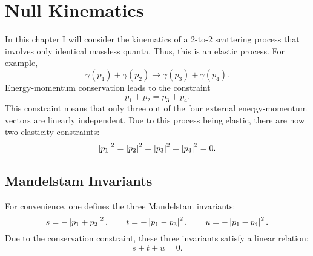 \chapter{Null Kinematics}
In this chapter I will consider the kinematics of a 2-to-2 scattering process that involves only identical massless quanta. Thus, this is an elastic process. For example,
\begin{equation}
	\gamma(p_{1}) + \gamma(p_{2}) \longrightarrow \gamma(p_{3}) + \gamma(p_{4}).
\end{equation}
Energy-momentum conservation leads to the constraint
\begin{equation}
	p_{1} + p_{2} = p_{3} + p_{4}.
\end{equation}
This constraint means that only three out of the four external energy-momentum vectors are linearly independent. Due to this process being elastic, there are now two elasticity constraints:
\begin{equation}
	\left\lvert p_{1} \right\rvert^{2} = \left\lvert p_{2} \right\rvert^{2} = \left\lvert p_{3} \right\rvert^{2} = \left\lvert p_{4} \right\rvert^{2} = 0.
\end{equation}
\section{Mandelstam Invariants}
For convenience, one defines the three Mandelstam invariants:
\begin{equation}
	s = -\left\lvert p_{1} + p_{2} \right\rvert^{2}, \qquad t = -\left\lvert p_{1} - p_{3} \right\rvert^{2}, \qquad u = -\left\lvert p_{1} - p_{4} \right\rvert^{2}. 
\end{equation}
Due to the conservation constraint, these three invariants satisfy a linear relation:
\begin{equation}
	s + t + u = 0.
\end{equation}
